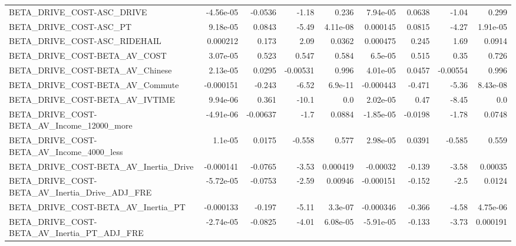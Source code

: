 \begin{tabular}{lrrrrrrrr}
BETA\_DRIVE\_COST-ASC\_DRIVE                          &   -4.56e-05 &      -0.0536 &    -1.18 &    0.236 &   7.94e-05 &      0.0638 &        -1.04 &         0.299 \\
BETA\_DRIVE\_COST-ASC\_PT                             &    9.18e-05 &       0.0843 &    -5.49 & 4.11e-08 &   0.000145 &      0.0815 &        -4.27 &      1.91e-05 \\
BETA\_DRIVE\_COST-ASC\_RIDEHAIL                       &    0.000212 &        0.173 &     2.09 &   0.0362 &   0.000475 &       0.245 &         1.69 &        0.0914 \\
BETA\_DRIVE\_COST-BETA\_AV\_COST                       &    3.07e-05 &        0.523 &    0.547 &    0.584 &    6.5e-05 &       0.515 &         0.35 &         0.726 \\
BETA\_DRIVE\_COST-BETA\_AV\_Chinese                    &    2.13e-05 &       0.0295 & -0.00531 &    0.996 &   4.01e-05 &      0.0457 &     -0.00554 &         0.996 \\
BETA\_DRIVE\_COST-BETA\_AV\_Commute                    &   -0.000151 &       -0.243 &    -6.52 &  6.9e-11 &  -0.000443 &      -0.471 &        -5.36 &      8.43e-08 \\
BETA\_DRIVE\_COST-BETA\_AV\_IVTIME                     &    9.94e-06 &        0.361 &    -10.1 &      0.0 &   2.02e-05 &        0.47 &        -8.45 &           0.0 \\
BETA\_DRIVE\_COST-BETA\_AV\_Income\_12000\_more          &   -4.91e-06 &     -0.00637 &     -1.7 &   0.0884 &  -1.85e-05 &     -0.0198 &        -1.78 &        0.0748 \\
BETA\_DRIVE\_COST-BETA\_AV\_Income\_4000\_less           &     1.1e-05 &       0.0175 &   -0.558 &    0.577 &   2.98e-05 &      0.0391 &       -0.585 &         0.559 \\
BETA\_DRIVE\_COST-BETA\_AV\_Inertia\_Drive              &   -0.000141 &      -0.0765 &    -3.53 & 0.000419 &   -0.00032 &      -0.139 &        -3.58 &       0.00035 \\
BETA\_DRIVE\_COST-BETA\_AV\_Inertia\_Drive\_ADJ\_FRE      &   -5.72e-05 &      -0.0753 &    -2.59 &  0.00946 &  -0.000151 &      -0.152 &         -2.5 &        0.0124 \\
BETA\_DRIVE\_COST-BETA\_AV\_Inertia\_PT                 &   -0.000133 &       -0.197 &    -5.11 &  3.3e-07 &  -0.000346 &      -0.366 &        -4.58 &      4.75e-06 \\
BETA\_DRIVE\_COST-BETA\_AV\_Inertia\_PT\_ADJ\_FRE         &   -2.74e-05 &      -0.0825 &    -4.01 & 6.08e-05 &  -5.91e-05 &      -0.133 &        -3.73 &      0.000191 \\

\end{tabular}
